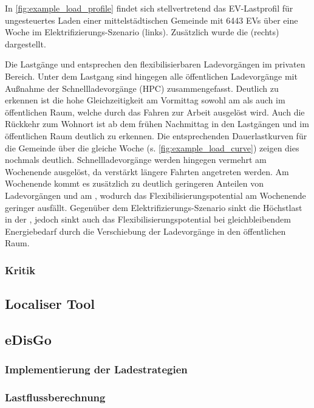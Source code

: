 

In \autoref{fig:example_load_profile} findet sich stellvertretend das \gls{EV}-Lastprofil für ungesteuertes Laden einer mittelstädtischen Gemeinde mit \num{6443} \glspl{EV} über eine Woche im Elektrifizierungs-Szenario (links).
Zusätzlich wurde die \SzeFirmenparkplatz (rechts) dargestellt.



Die Lastgänge \zH und \Firmeparkplatz entsprechen den flexibilisierbaren Ladevorgängen im privaten Bereich. Unter dem Lastgang \oeffen sind hingegen alle öffentlichen Ladevorgänge mit Außnahme der Schnellladevorgänge (\gls{HPC}) zusammengefasst. Deutlich zu erkennen ist die hohe Gleichzeitigkeit am Vormittag sowohl am \Firmeparkplatz als auch im öffentlichen Raum, welche durch das Fahren zur Arbeit ausgelöst wird.
Auch die Rückkehr zum Wohnort ist ab dem frühen Nachmittag in den Lastgängen \zH und im öffentlichen Raum deutlich zu erkennen. Die entsprechenden Dauerlastkurven für die Gemeinde über die gleiche Woche (s. \autoref{fig:example_load_curve}) zeigen dies nochmals deutlich.
Schnellladevorgänge werden hingegen vermehrt am Wochenende ausgelöst, da verstärkt längere Fahrten angetreten werden.
Am Wochenende kommt es zusätzlich zu deutlich geringeren Anteilen von Ladevorgängen \zH und am \Firmeparkplatzdot, wodurch das Flexibilisierungspotential am Wochenende geringer ausfällt.
Gegenüber dem Elektrifizierungs-Szenario sinkt die Höchstlast in der \SzeFirmenparkplatzdot, jedoch sinkt auch das Flexibilisierungspotential bei gleichbleibendem Energiebedarf durch die Verschiebung der Ladevorgänge in den öffentlichen Raum.




\subsubsection{Kritik}




\subsection{Localiser Tool}


\subsection{eDisGo}

\subsubsection{Implementierung der Ladestrategien}

\subsubsection{Lastflussberechnung}